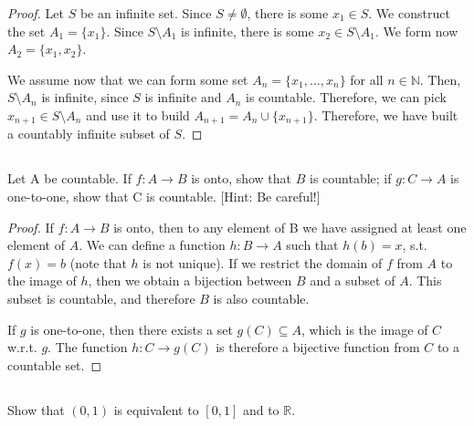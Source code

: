 \begin{proof}

Let $S$ be an infinite set. Since $S \neq \emptyset$, there is some $x_1 \in S$. We construct the set $A_1 =\{x_1\}$. Since $S \setminus A_1$ is infinite, there is some $x_2 \in S \setminus A_1$. We form now $A_2 = \{x_1, x_2\}$.

We assume now that we can form some set $A_n = \{x_1, \dots, x_n\}$ for all $n\in\mathbb{N}$. Then, $S \setminus A_n$ is infinite, since $S$ is infinite and $A_n$ is countable. Therefore, we can pick $x_{n+1} \in S \setminus A_n$ and use it to build $A_{n+1} = A_n \cup \{x_{n+1}\}$. Therefore, we have built a countably infinite subset of $S$.

\end{proof}


\subsection{} Let A be countable. If $f : A \rightarrow B$ is onto, show that $B$ is countable; if $g : C \rightarrow A$ is one-to-one, show that C is countable. [Hint: Be careful!]

\begin{proof}

If $f : A \rightarrow B$ is onto, then to any element of B we have assigned at least one element of $A$. We can define a function $h: B \rightarrow A$ such that $h(b) = x$, s.t. $f(x) = b$ (note that $h$ is not unique). If we restrict the domain of $f$ from $A$ to the image of $h$, then we obtain a bijection between $B$ and a subset of $A$. This subset is countable, and therefore $B$ is also countable.

If $g$ is one-to-one, then there exists a set $g(C) \subseteq A$, which is the image of $C$ w.r.t. $g$. The function $h: C \rightarrow g(C)$ is therefore a bijective function from $C$ to a countable set.

\end{proof}


\subsection{} Show that $(0, 1)$ is equivalent to $[ 0, 1 ]$ and to $\mathbb{R}$.

